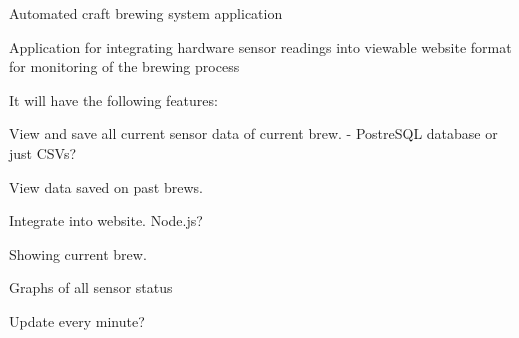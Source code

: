 Automated craft brewing system application

Application for integrating hardware sensor readings into viewable website format for monitoring of the brewing process

It will have the following features\+:
\begin{DoxyItemize}
\item View and save all current sensor data of current brew. -\/ Postre\+S\+QL database or just C\+S\+Vs?
\item View data saved on past brews.
\item Integrate into website. Node.\+js?
\begin{DoxyItemize}
\item Showing current brew.
\item Graphs of all sensor status
\item Update every minute? 
\end{DoxyItemize}
\end{DoxyItemize}